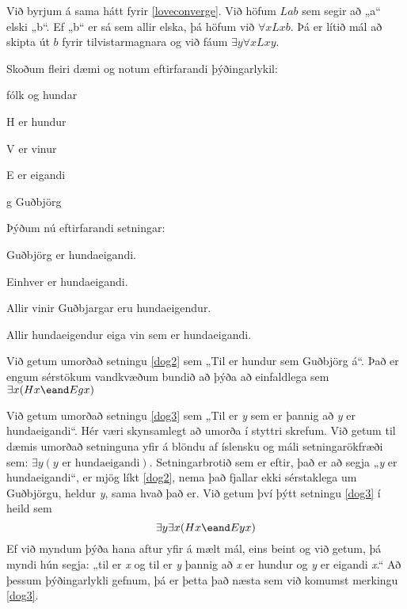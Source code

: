Við byrjum á sama hátt fyrir \ref{loveconverge}. Við höfum $Lab$ sem segir að „a“ elski „b“. Ef „b“ er sá sem allir elska, þá höfum við $\forall x Lxb$. Þá er lítið mál að skipta út $b$ fyrir tilvistarmagnara og við fáum $\exists y \forall x Lxy$.

Skoðum fleiri dæmi og notum eftirfarandi þýðingarlykil:

\begin{ekey}
\item[\text{yfirgrip}] fólk og hundar
\item[H]  er hundur
\item[V]  er vinur 
\item[E]  er eigandi 
\item[g] Guðbjörg
\end{ekey}
Þýðum nú eftirfarandi setningar:
\begin{earg}
\item[\ex{dog2}] Guðbjörg er hundaeigandi.
\item[\ex{dog3}] Einhver er hundaeigandi.
\item[\ex{dog4}] Allir vinir Guðbjargar eru hundaeigendur.
\item[\ex{dog5}] Allir hundaeigendur eiga vin sem er hundaeigandi.
\end{earg}
Við getum umorðað setningu \ref{dog2} sem „Til er hundur sem Guðbjörg á“. Það er engum sérstökum vandkvæðum bundið að þýða að einfaldlega sem $\exists x(Hx \eand Egx)$

Við getum umorðað setningu \ref{dog3} sem „Til er \emph{y} sem er þannig að \emph{y} er hundaeigandi“. Hér væri skynsamlegt að umorða í styttri skrefum. Við getum til dæmis umorðað setninguna yfir á blöndu af íslensku og máli setningarökfræði sem: $\exists y(y\text{ er hundaeigandi})$. Setningarbrotið sem er eftir, það er að segja „\emph{y} er hundaeigandi“, er mjög líkt \ref{dog2}, nema það fjallar ekki sérstaklega um Guðbjörgu, heldur \emph{y}, sama hvað það er. Við getum því þýtt setningu \ref{dog3} í heild sem $$\exists y \exists x(Hx \eand Eyx)$$ Ef við myndum þýða hana aftur yfir á mælt mál, eins beint og við getum, þá myndi hún segja: „til er \emph{x} og til er \emph{y} þannig að \emph{x} er hundur og \emph{y} er eigandi \emph{x}.“ Að þessum þýðingarlykli gefnum, þá er þetta það næsta sem við komumst merkingu \ref{dog3}.

